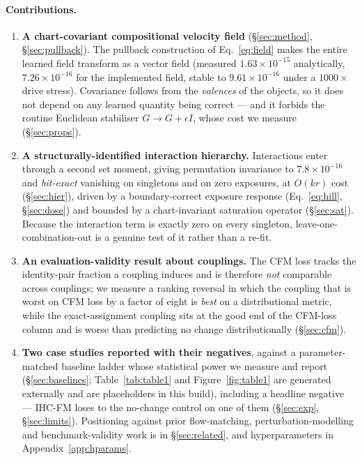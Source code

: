 \documentclass{article}
\newcommand{\tabonelabel}{tab:table1}
\begin{document}
\paragraph{Contributions.}
\begin{enumerate}
\item \textbf{A chart-covariant compositional velocity field} (\S\ref{sec:method},
      \S\ref{sec:pullback}). The pullback construction of
      Eq.~\ref{eq:field} makes the entire learned field transform as a vector field
      (measured $1.63\times10^{-15}$ analytically, $7.26\times10^{-16}$ for the implemented
      field, stable to $9.61\times10^{-16}$ under a $1000\times$ drive stress). Covariance
      follows from the \emph{valences} of the objects, so it does not depend on any learned
      quantity being correct --- and it forbids the routine Euclidean stabiliser
      $G \to G + \epsilon I$, whose cost we measure (\S\ref{sec:props}).
\item \textbf{A structurally-identified interaction hierarchy.} Interactions enter through a
      second set moment, giving permutation invariance to $7.8\times10^{-16}$ and
      \emph{bit-exact} vanishing on singletons and on zero exposures, at $O(kr)$ cost
      (\S\ref{sec:hier}), driven by a boundary-correct exposure response
      (Eq.~\ref{eq:hill}, \S\ref{sec:dose}) and bounded by a chart-invariant saturation
      operator (\S\ref{sec:sat}). Because the interaction term is exactly zero on every singleton,
      leave-one-combination-out is a genuine test of it rather than a re-fit.
\item \textbf{An evaluation-validity result about couplings.} The CFM loss tracks the
      identity-pair fraction a coupling induces and is therefore \emph{not} comparable
      across couplings; we measure a ranking reversal in which the coupling that is worst on
      CFM loss by a factor of eight is \emph{best} on a distributional metric, while the
      exact-assignment coupling sits at the good end of the CFM-loss column and is worse
      than predicting no change distributionally (\S\ref{sec:cfm}).
\item \textbf{Two case studies reported with their negatives}, against a
      parameter-matched baseline ladder whose statistical power we measure and report
      (\S\ref{sec:baselines}; Table~\ref{\tabonelabel} and Figure~\ref{fig:table1} are
      generated externally and are placeholders in this build), including a
      headline negative --- IHC-FM loses to the no-change control on one of them
      (\S\ref{sec:exp}, \S\ref{sec:limits}). Positioning against prior flow-matching,
      perturbation-modelling and benchmark-validity work is in \S\ref{sec:related}, and
      hyperparameters in Appendix~\ref{app:hparams}.
\end{enumerate}
\end{document}
